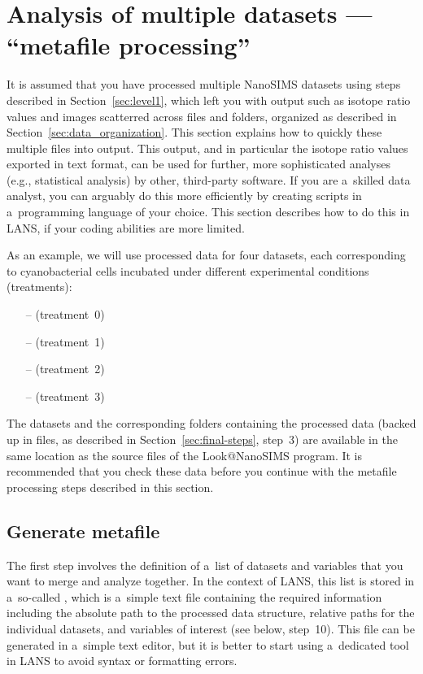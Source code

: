 \section{Analysis of multiple datasets --- ``metafile processing''}
\label{sec:level2}

It is assumed that you have processed multiple NanoSIMS datasets using steps described in Section~\ref{sec:level1}, which left you with output such as isotope ratio values and images scatterred across  files and folders, organized as described in Section~\ref{sec:data_organization}. This section explains how to quickly  these multiple files into  output. This output, and in particular the isotope ratio values exported in text format, can be used for further, more sophisticated analyses (e.g., statistical analysis) by other, third-party software. If you are a~skilled data analyst, you can arguably do this more efficiently by creating scripts in a~programming language of your choice. This section describes how to do this in LANS, if your coding abilities are more limited.

As an example, we will use processed data for four datasets, each corresponding to cyanobacterial cells incubated under different experimental conditions (treatments): 
\begin{itemize}
\item[--] (treatment~0)
\item[--] (treatment~1)
\item[--] (treatment~2)
\item[--] (treatment~3)
\end{itemize}
The datasets and the corresponding folders containing the processed data (backed up in  files, as described in Section~\ref{sec:final-steps}, step~3) are available in the same location as the source files of the Look@NanoSIMS program. It is recommended that you check these data before you continue with the metafile processing steps described in this section.


\subsection{Generate metafile}
\setcounter{step}{0}

\goldbox{}
The first step involves the definition of a~list of datasets and variables that you want to merge and analyze together. In the context of LANS, this list is stored in a~so-called , which is a~simple text file containing the required information including the absolute path to the processed data structure, relative paths for the individual datasets, and variables of interest (see below, step~10). This file can be generated in a~simple text editor, but it is better to start using a~dedicated tool in LANS to avoid syntax or formatting errors.
\tcbe

